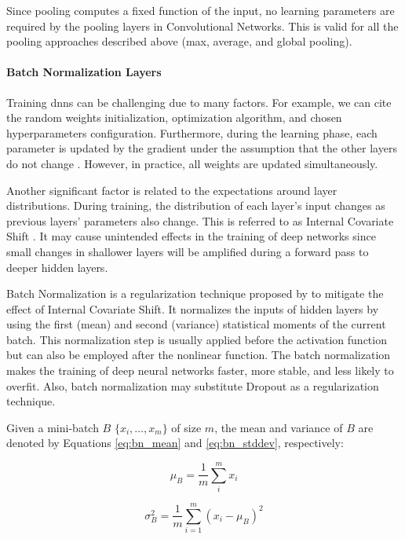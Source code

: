 Since pooling computes a fixed function of the input, no learning parameters are required by the pooling layers in Convolutional Networks. This is valid for all the pooling approaches described above (max, average, and global pooling).


\paragraph{Batch Normalization Layers}

Training \aclp{dnn} can be challenging due to many factors. For example, we can cite the random weights initialization, optimization algorithm, and chosen hyperparameters configuration. Furthermore, during the learning phase, each parameter is updated by the gradient under the assumption that the other layers do not change \citep{goodfellow2016deep}. However, in practice, all weights are updated simultaneously.

Another significant factor is related to the expectations around layer distributions. During training, the distribution of each layer's input changes as previous layers' parameters also change. This is referred to as Internal Covariate Shift \citep{ioffe2015batch}. It may cause unintended effects in the training of deep networks since small changes in shallower layers will be amplified during a forward pass to deeper hidden layers.

Batch Normalization is a regularization technique proposed by \cite{ioffe2015batch} to mitigate the effect of Internal Covariate Shift. It normalizes the inputs of hidden layers by using the first (mean) and second (variance) statistical moments of the current batch. This normalization step is usually applied before the activation function but can also be employed after the nonlinear function. The batch normalization makes the training of deep neural networks faster, more stable, and less likely to overfit. Also, batch normalization may substitute Dropout as a regularization technique.

Given a mini-batch $B$ $\{x_i, \ldots, x_m\}$ of size $m$, the mean and variance of $B$ are denoted by Equations \ref{eq:bn_mean} and \ref{eq:bn_stddev}, respectively:

\begin{equation}
\label{eq:bn_mean}
\mu_B = \frac{1}{m} \sum_{i}^{m} x_i
\end{equation}

\begin{equation}
\label{eq:bn_stddev}
\sigma_B^2 = \frac{1}{m} \sum_{i=1}^{m} (x_i - \mu_B)^{2}
\end{equation}

